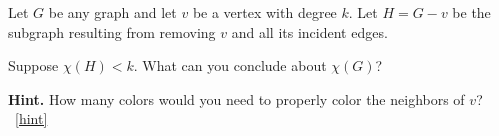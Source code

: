 \documentclass{book}
\begin{document}
\setcounter{project}{44}
\addtocounter{project}{-1}
\begin{activity}[]\label{activity-37}
\hypertarget{p-413}{}%
Let \(G\) be any graph and let \(v\) be a vertex with degree \(k\).  Let \(H = G - v\) be the subgraph resulting from removing \(v\) and all its incident edges.%
\par
\hypertarget{p-414}{}%
Suppose \(\chi(H) \lt k\).  What can you conclude about \(\chi(G)\)?%
\par\smallskip%
\noindent\textbf{Hint.}\hypertarget{hint-18}{}\quad%
\hypertarget{p-415}{}%
How many colors would you need to properly color the neighbors of \(v\)?%
~\hfill{\tiny\hyperlink{a-44}{[hint]}\hypertarget{q-44}{}}\end{activity}
\end{document}

